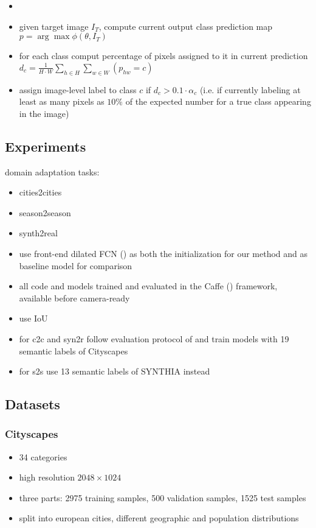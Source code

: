 \begin{itemize}
	\item {}
	\item given target image $I_T$, compute current output class prediction map $p = \arg \max \phi (\theta, I_T)$
	\item for each class comput percentage of pixels assigned to it in current prediction $d_c = \frac{1}{H\cdot W} \sum_{h\in H} \sum_{w\in W}(p_{hw} = c)$
	\item assign image-level label to class $c$ if $d_c > 0.1 \cdot \alpha_c$ (i.e. if currently labeling at least as many pixels as $10\%$ of the expected number for a true class appearing in the image)
\end{itemize}

\subsection{Experiments}
	domain adaptation tasks:
\begin{itemize}
	\item cities2cities
	\item season2season
	\item synth2real
	\item use front-end dilated FCN () as both the initialization for our method and as baseline model for comparison
	\item all code and models trained and evaluated in the Caffe () framework, available before camera-ready
	\item use IoU
	\item for c2c and syn2r follow evaluation protocol of  and train models with 19 semantic labels of Cityscapes
	\item for s2s use 13 semantic labels of SYNTHIA instead
\end{itemize}

\subsection{Datasets}

\subsubsection{Cityscapes}
\begin{itemize}
	\item 34 categories
	\item high resolution $2048 \times 1024$
	\item three parts: 2975 training samples, 500 validation samples, 1525 test samples
	\item split into european cities, different geographic and population distributions
\end{itemize}

